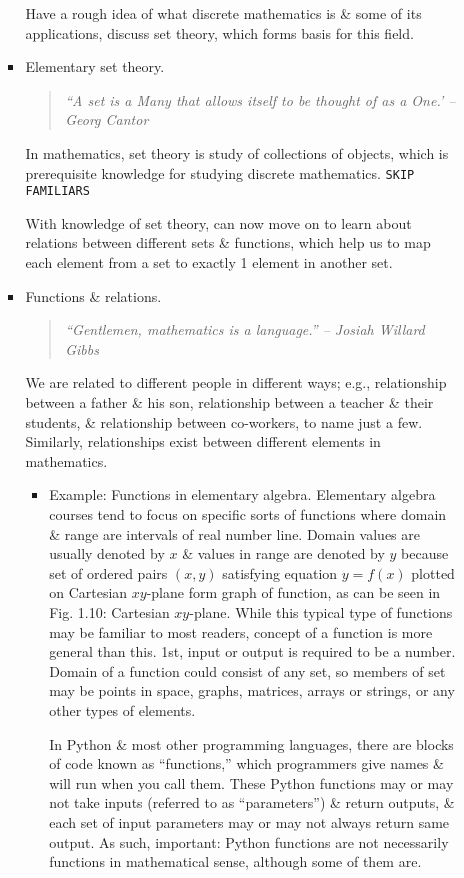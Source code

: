\documentclass{article}
\begin{document}
\begin{enumerate}
\begin{itemize}
\begin{itemize}
\begin{itemize}
			\end{itemize}
			Have a rough idea of what discrete mathematics is \& some of its applications, discuss set theory, which forms basis for this field.
			\item {\sf Elementary set theory.}
			\begin{quote}\it
				``A set is a Many that allows itself to be thought of as a One.' -- {\sc Georg Cantor}
			\end{quote}
			In mathematics, set theory is study of collections of objects, which is prerequisite knowledge for studying discrete mathematics. {\tt SKIP FAMILIARS}
			
			With knowledge of set theory, can now move on to learn about relations between different sets \& functions, which help us to map each element from a set to exactly 1 element in another set.
			\item {\sf Functions \& relations.}
			\begin{quote}\it
				``Gentlemen, mathematics is a language.'' -- {\sc Josiah Willard Gibbs}
			\end{quote}
			We are related to different people in different ways; e.g., relationship between a father \& his son, relationship between a teacher \& their students, \& relationship between co-workers, to name just a few. Similarly, relationships exist between different elements in mathematics.
			\begin{itemize}
				\item {\sf Example: Functions in elementary algebra.} Elementary algebra courses tend to focus on specific sorts of functions where domain \& range are intervals of real number line. Domain values are usually denoted by $x$ \& values in range are denoted by $y$ because set of ordered pairs $(x,y)$ satisfying equation $y = f(x)$ plotted on Cartesian $xy$-plane form graph of function, as can be seen in {\sf Fig. 1.10: Cartesian $xy$-plane}. While this typical type of functions may be familiar to most readers, concept of a function is more general than this. 1st, input or output is required to be a number. Domain of a function could consist of any set, so members of set may be points in space, graphs, matrices, arrays or strings, or any other types of elements.
				
				In Python \& most other programming languages, there are blocks of code known as ``functions,'' which programmers give names \& will run when you call them. These Python functions may or may not take inputs (referred to as ``parameters'') \& return outputs, \& each set of input parameters may or may not always return same output. As such, important: Python functions are not necessarily functions in mathematical sense, although some of them are.
				

\end{itemize}
\end{itemize}
\end{itemize}
\end{enumerate}
\end{document}
